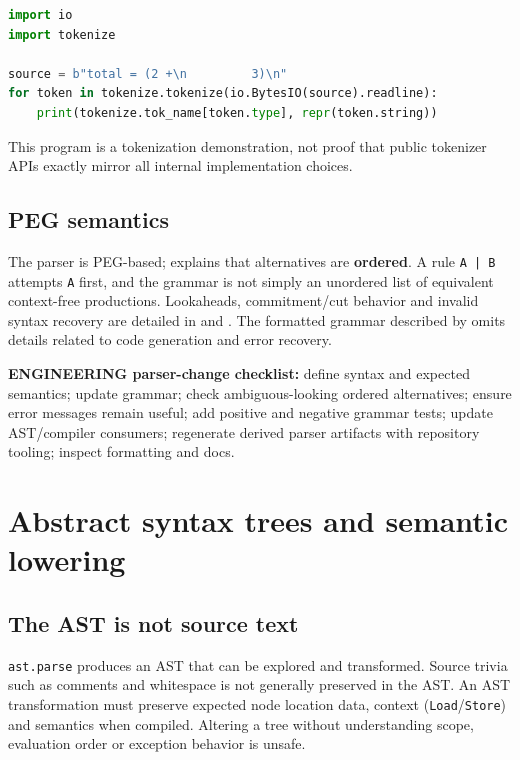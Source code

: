 \documentclass[
  11pt,
]{report}
\newcommand{\passthrough}[1]{#1}
\begin{document}
\begin{lstlisting}[language=Python]
import io
import tokenize

source = b"total = (2 +\n         3)\n"
for token in tokenize.tokenize(io.BytesIO(source).readline):
    print(tokenize.tok_name[token.type], repr(token.string))
\end{lstlisting}

This program is a tokenization demonstration, not proof that public
tokenizer APIs exactly mirror all internal implementation choices.

\section{PEG semantics}\label{peg-semantics}

The parser is PEG-based;
 explains that
alternatives are \textbf{ordered}. A rule
\passthrough{\lstinline!A | B!} attempts \passthrough{\lstinline!A!}
first, and the grammar is not simply an unordered list of equivalent
context-free productions. Lookaheads, commitment/cut behavior and
invalid syntax recovery are detailed in
 and
. The
formatted grammar described by
 omits details
related to code generation and error recovery.

\textbf{ENGINEERING parser-change checklist:} define syntax and expected
semantics; update grammar; check ambiguous-looking ordered alternatives;
ensure error messages remain useful; add positive and negative grammar
tests; update AST/compiler consumers; regenerate derived parser
artifacts with repository tooling; inspect formatting and docs.

\chapter{Abstract syntax trees and semantic
lowering}\label{abstract-syntax-trees-and-semantic-lowering}

\section{The AST is not source text}\label{the-ast-is-not-source-text}

\passthrough{\lstinline!ast.parse!} produces an AST that can be explored
and transformed. Source trivia such as comments and whitespace is not
generally preserved in the AST. An AST transformation must preserve
expected node location data, context
(\passthrough{\lstinline!Load!}/\passthrough{\lstinline!Store!}) and
semantics when compiled. Altering a tree without understanding scope,
evaluation order or exception behavior is unsafe.
\end{document}
